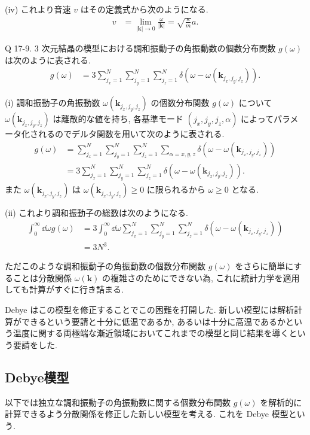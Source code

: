 \documentclass[uplatex,dvipdfmx,a4paper,11pt]{jlreq}
\theoremstyle{definition}
\begin{document}
(iv) これより音速 $v$ はその定義式から次のようになる.
\begin{align}
  v & = \lim_{|\bm{k}|\to 0}\frac{\omega}{|\bm{k}|} = \sqrt{\frac{\kappa}{m}}a.
\end{align}

\begin{itembox}[l]{Q 17-9.}
  3 次元結晶の模型における調和振動子の角振動数の個数分布関数 $g(\omega)$ は次のように表される.
  \begin{align}
    g(\omega) & = 3\sum_{j_x=1}^{N}\sum_{j_y=1}^{N}\sum_{j_z=1}^{N}\delta(\omega - \omega(\bm{k}_{j_x,j_y,j_z})).
  \end{align}
\end{itembox}

(i) 調和振動子の角振動数 $\omega(\bm{k}_{j_x, j_y, j_z})$ の個数分布関数 $g(\omega)$ について $\omega(\bm{k}_{j_x, j_y, j_z})$ は離散的な値を持ち, 各基準モード $(j_x, j_y, j_z, \alpha)$ によってパラメータ化されるのでデルタ関数を用いて次のように表される.
\begin{align}
  g(\omega) & = \sum_{j_x=1}^{N}\sum_{j_y=1}^{N}\sum_{j_z=1}^{N}\sum_{\alpha=x,y,z}\delta(\omega - \omega(\bm{k}_{j_x,j_y,j_z})) \\
            & = 3\sum_{j_x=1}^{N}\sum_{j_y=1}^{N}\sum_{j_z=1}^{N}\delta(\omega - \omega(\bm{k}_{j_x,j_y,j_z})).
\end{align}
また $\omega(\bm{k}_{j_x,j_y,j_z})$ は $\omega(\bm{k}_{j_x,j_y,j_z})\geq 0$ に限られるから $\omega\geq 0$ となる.

(ii) これより調和振動子の総数は次のようになる.
\begin{align}
  \int_0^\infty\dd{\omega}g(\omega) & = 3\int_0^\infty\dd{\omega}\sum_{j_x=1}^{N}\sum_{j_y=1}^{N}\sum_{j_z=1}^{N}\delta(\omega - \omega(\bm{k}_{j_x,j_y,j_z})) \\
                                    & = 3N^3.
\end{align}

ただこのような調和振動子の角振動数の個数分布関数 $g(\omega)$ をさらに簡単にすることは分散関係 $\omega(\bm{k})$ の複雑さのためにできない為, これに統計力学を適用しても計算がすぐに行き詰まる.

Debye はこの模型を修正することでこの困難を打開した. 新しい模型には解析計算ができるという要請と十分に低温であるか, あるいは十分に高温であるかという温度に関する両極端な漸近領域においてこれまでの模型と同じ結果を導くという要請をした.

\subsection{Debye模型}
以下では独立な調和振動子の角振動数に関する個数分布関数 $g(\omega)$ を解析的に計算できるよう分散関係を修正した新しい模型を考える. これを Debye 模型という.
\end{document}

